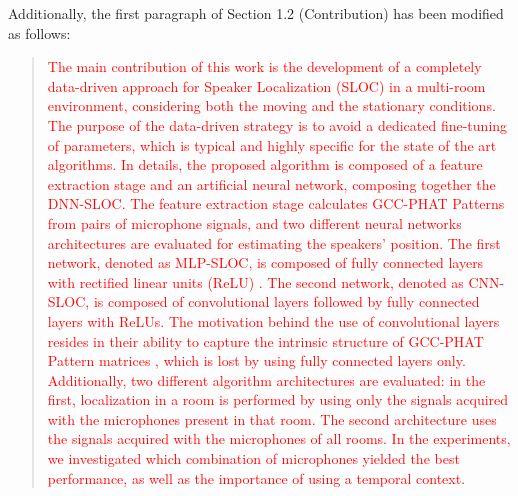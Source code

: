 \documentclass[11pt, technote, letterpaper, oneside, onecolumn]{IEEEtran}
\begin{document}
\begin{enumerate}
Additionally, the first paragraph of Section 1.2 (Contribution) has been modified as follows:
	\begin{quote}
		\textcolor{red}{
		The main contribution of this work is the development of a completely data-driven approach for Speaker Localization (SLOC) in a multi-room environment, considering both the moving and the stationary conditions. 		The purpose of the data-driven strategy is to avoid a dedicated fine-tuning of parameters, which is typical and highly specific for the state of the art algorithms.
		In details, the proposed algorithm is composed of a feature extraction stage and an artificial neural network, composing together the DNN-SLOC. The feature extraction stage calculates GCC-PHAT Patterns \cite{xiao2015learning} from pairs of microphone signals, and two different neural networks architectures are evaluated for estimating the speakers' position. The first network, denoted as MLP-SLOC, is composed of fully connected layers with rectified linear units (ReLU) \cite{nair2010rectified}. The second network, denoted as CNN-SLOC, is composed of convolutional layers followed by fully connected layers with ReLUs. The motivation behind the use of convolutional layers resides in their ability to capture the intrinsic structure of GCC-PHAT Pattern matrices \cite{xiao2015learning}, which is lost by using fully connected layers only. Additionally, two different algorithm architectures are evaluated: in the first, localization in a room is performed by using only the signals acquired with the microphones present in that room. The second architecture uses the signals acquired with the microphones of all rooms. In the experiments, we investigated which combination of microphones yielded the best performance, as well as the importance of using a temporal context.
		}
	\end{quote}


\end{enumerate}
\end{document}
